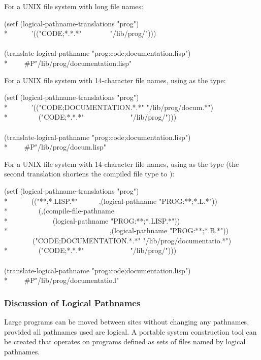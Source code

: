 For a UNIX file system with long file names:
\begin{lisp}
(setf (logical-pathname-translations "prog") \\*
~~~~~~'(("CODE;*.*.*"~~~~~~~~"/lib/prog/"))) \\
\\
(translate-logical-pathname "prog:code;documentation.lisp") \\*
~~~\EV\ \#P"/lib/prog/documentation.lisp"
\end{lisp}
For a UNIX file system with 14-character file names, using  as the type:
\begin{lisp}
(setf (logical-pathname-translations "prog") \\*
~~~~~~'(("CODE;DOCUMENTATION.*.*" "/lib/prog/docum.*") \\*
~~~~~~~~("CODE;*.*.*"~~~~~~~~~~~~~"/lib/prog/"))) \\
\\
(translate-logical-pathname "prog:code;documentation.lisp") \\*
~~~\EV\ \#P"/lib/prog/docum.lisp"
\end{lisp}
For a UNIX file system with 14-character file names, using  as the type
(the second translation shortens the compiled file type to ):
\begin{lisp}
(setf (logical-pathname-translations "prog") \\*
~~~~~~{\Xbq}(("**;*.LISP.*"~~~~~~,(logical-pathname "PROG:**;*.L.*")) \\*
~~~~~~~~(,(compile-file-pathname \\*
~~~~~~~~~~~~(logical-pathname "PROG:**;*.LISP.*")) \\*
~~~~~~~~~~~~~~~~~~~~~~~~~~~~,(logical-pathname "PROG:**;*.B.*")) \\
~~~~~~~~("CODE;DOCUMENTATION.*.*" "/lib/prog/documentatio.*") \\*
~~~~~~~~("CODE;*.*.*"~~~~~~~~~~~~~"/lib/prog/"))) \\
\\
(translate-logical-pathname "prog:code;documentation.lisp") \\*
~~~\EV\ \#P"/lib/prog/documentatio.l"
\end{lisp}

\subsubsection{Discussion of Logical Pathnames}

  Large programs can be moved between sites without changing any
  pathnames, provided all pathnames used are logical.  A portable system
  construction tool can be created that operates on programs defined as
  sets of files named by logical pathnames.

